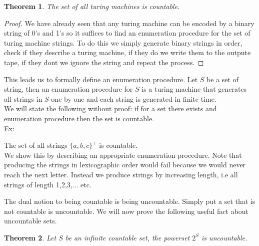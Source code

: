\documentclass[11pt]{exam}
\newtheorem{theorem}{Theorem}[section]
\begin{document}
\begin{theorem}
The set of all turing machines is countable. 
\end{theorem}

\begin{proof}
We have already seen that any turing machine can be encoded by a binary string of 0's and 1's so it suffices to find an enumeration procedure for the set of turing machine strings. To do this we simply generate binary strings in order, check if they describe a turing machine, if they do we write them to the outpute tape, if they dont we ignore the string and repeat the process.
\end{proof}

This leads us to formally define an enumeration procedure. Let $S$ be a set of string, then an enumeration procedure for $S$ is a turing machine that generates all strings in $S$ one by one and each string is generated in finite time.\\

We will state the following without proof: if for a set there exists and enumeration procedure then the set is countable.\\

Ex:
\begin{center}
The set of all strings $\{a,b,c\}^+$ is countable.\\

We show this by describing an appropriate enumeration procedure. Note that producing the strings in lexicographic order would fail because we would never reach the next letter. Instead we produce strings by increasing length, i.e all strings of length 1,2,3,... etc.
\end{center}

The dual notion to being countable is being uncountable. Simply put a set that is not countable is uncountable. We will now prove the following useful fact about uncountable sets.

\begin{theorem}
Let $S$ be an infinite countable set, the powerset $2^S$ is uncountable.
\end{theorem}
\end{document}
